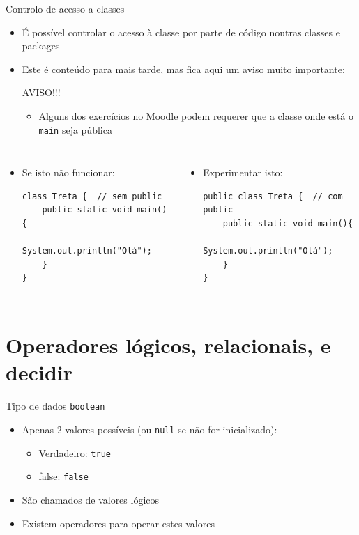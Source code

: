 \documentclass[portuguese, aspectratio=169, xcolor=table]{beamer}
\begin{document}
\begin{frame}[fragile]{Controlo de acesso a classes}
\begin{itemize}
    \item É possível controlar o acesso à classe por parte de código noutras classes e packages
    \item Este é conteúdo para mais tarde, mas fica aqui um aviso muito importante:
    \begin{alertblock}{AVISO!!!}
        \begin{itemize}
            \item Alguns dos exercícios no Moodle podem requerer que a classe onde está o \texttt{main} seja pública
        \end{itemize}
    \end{alertblock}
\end{itemize}
\begin{columns}
\begin{itemize}
\item Se isto não funcionar:
\begin{verbatim}
class Treta {  // sem public
    public static void main(){
        System.out.println("Olá");
    }
}
\end{verbatim}
\end{itemize}
\begin{itemize}
    \item Experimentar isto:
\begin{verbatim}
public class Treta {  // com public
    public static void main(){
        System.out.println("Olá");
    }
}
\end{verbatim}
\end{itemize}
\end{columns}
\end{frame}

\section{Operadores lógicos, relacionais, e decidir}
\begin{frame}{Tipo de dados \texttt{boolean}}
\begin{itemize}
    \item Apenas 2 valores possíveis (ou \texttt{null} se não for inicializado):
    \begin{itemize}
        \item Verdadeiro: \texttt{true}
        \item false: \texttt{false} 
    \end{itemize}
\item São chamados de valores lógicos
\item Existem operadores para operar estes valores
\end{itemize}
\end{frame}
\end{document}
